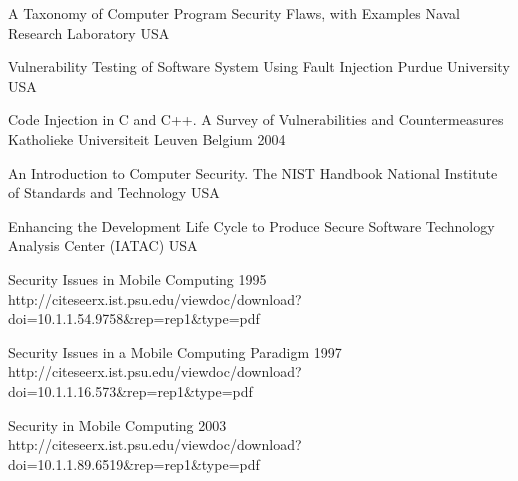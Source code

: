\begin{thebibliography}{9}

		{
			\biband
			\biband
			\biband
			}
		{A Taxonomy of Computer Program Security Flaws, with Examples}
		{Naval Research Laboratory}
		{USA}
		{}
		
		{
			\biband
			}
		{Vulnerability Testing of Software System Using Fault Injection}
		{Purdue University}
		{USA}
		{}

		{
			\biband
			\biband
			}
		{Code Injection in {C} and {C++}. A Survey of Vulnerabilities and Countermeasures}
		{Katholieke Universiteit Leuven}
		{Belgium}
		{2004}
		
		{}
		{An Introduction to Computer Security. The {NIST} Handbook}
		{National Institute of Standards and Technology}
		{USA}
		{}
	
		{
			\biband
			}
		{Enhancing the Development Life Cycle to Produce Secure Software}
		{Technology Analysis Center (IATAC)}
		{USA}
		{}



		{}
		{Security Issues in Mobile Computing}	
		{1995}	
		{http://citeseerx.ist.psu.edu/viewdoc/download?doi=10.1.1.54.9758\&rep=rep1\&type=pdf}
		
		{
			\biband
			}
		{Security Issues in a Mobile Computing Paradigm}	
		{1997}	
		{http://citeseerx.ist.psu.edu/viewdoc/download?doi=10.1.1.16.573\&rep=rep1\&type=pdf}
	
		{
			\biband
			\biband
			\biband
			}
		{Security in Mobile Computing}	
		{2003}	
		{http://citeseerx.ist.psu.edu/viewdoc/download?doi=10.1.1.89.6519\&rep=rep1\&type=pdf}


\end{thebibliography}
